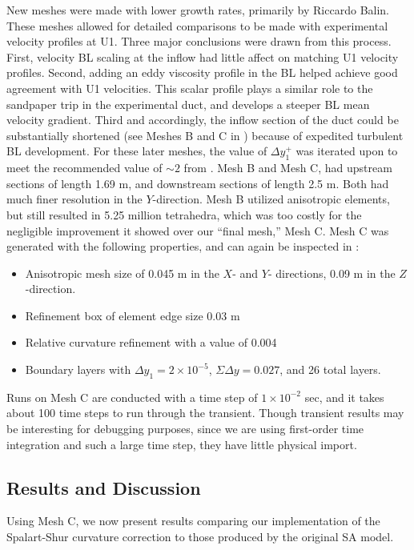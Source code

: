 \documentclass[11pt]{article}
\begin{document}
New meshes were made with lower growth rates, primarily by Riccardo Balin. These meshes allowed for detailed comparisons to be made with experimental velocity profiles at U1. Three major conclusions were drawn from this process. First, velocity BL scaling at the inflow had little affect on matching U1 velocity profiles. Second, adding an eddy viscosity profile in the BL helped achieve good agreement with U1 velocities. This scalar profile plays a similar role to the sandpaper trip in the experimental duct, and develops a steeper BL mean velocity gradient. Third and accordingly, the inflow section of the duct could be substantially shortened (see Meshes B and C in ) because of expedited turbulent BL development. For these later meshes, the value of $\Delta y^+_1$ was iterated upon to meet the recommended value of $\sim 2$ from \citet{spalart2001}. Mesh B and Mesh C, had upstream sections of length 1.69 m, and downstream sections of length 2.5 m. Both had much finer resolution in the $Y$-direction. Mesh B utilized anisotropic elements, but still resulted in 5.25 million tetrahedra, which was too costly for the negligible improvement it showed over our ``final mesh,'' Mesh C. Mesh C was generated with the following properties, and can again be inspected in :
\begin{itemize}
\item Anisotropic mesh size of 0.045 m in the $X$- and $Y$- directions, 0.09 m in the $Z$-direction.
\item Refinement box of element edge size 0.03 m
\item Relative curvature refinement with a value of 0.004
\item Boundary layers with $\Delta y_1 = 2 \times 10^{-5}$, $\Sigma \Delta y = 0.027$, and 26 total layers.
\end{itemize}

Runs on Mesh C are conducted with a time step of $1 \times 10^{-2}$ sec, and it takes about 100 time steps to run through the transient. Though transient results may be interesting for debugging purposes, since we are using first-order time integration and such a large time step, they have little physical import.

\subsection{Results and Discussion}

Using Mesh C, we now present results comparing our implementation of the Spalart-Shur curvature correction to those produced by the original SA model.
\end{document}
